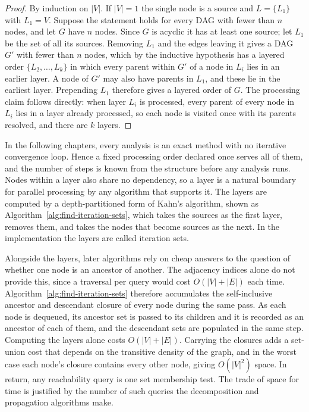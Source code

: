 \documentclass[12pt]{report}
\begin{document}
\begin{proof}
By induction on $|V|$. If $|V| = 1$ the single node is a source and $L = \{L_1\}$ with
$L_1 = V$. Suppose the statement holds for every DAG with fewer than $n$ nodes, and let $G$ have
$n$ nodes. Since $G$ is acyclic it has at least one source; let $L_1$ be the set of all its
sources. Removing $L_1$ and the edges leaving it gives a DAG $G'$ with fewer than $n$ nodes,
which by the inductive hypothesis has a layered order $\{L_2, \dots, L_k\}$ in which every
parent within $G'$ of a node in $L_i$ lies in an earlier layer. A node of $G'$ may also have
parents in $L_1$, and these lie in the earliest layer. Prepending $L_1$ therefore gives a
layered order of $G$. The processing claim follows directly: when layer $L_i$ is processed,
every parent of every node in $L_i$ lies in a layer already processed, so each node is visited
once with its parents resolved, and there are $k$ layers.
\end{proof}

In the following chapters, every analysis is an exact method with no iterative convergence
loop. Hence a fixed processing order declared once serves all of them, and the number of
steps is known from the structure before any analysis runs. Nodes within a layer also share
no dependency, so a layer is a natural boundary for parallel processing by any algorithm
that supports it. The layers are computed by a
depth-partitioned form of Kahn's algorithm, shown as Algorithm~\ref{alg:find-iteration-sets},
which takes the sources as the first layer, removes them, and takes the nodes that become
sources as the next. In the implementation the layers are called iteration sets.

Alongside the layers, later algorithms rely on cheap answers to the question of whether one
node is an ancestor of another. The adjacency indices alone do not provide this, since a
traversal per query would cost $O(|V|+|E|)$ each time. Algorithm~\ref{alg:find-iteration-sets}
therefore accumulates the self-inclusive ancestor and descendant closure of every node during
the same pass. As each node is dequeued, its ancestor set is passed to its children and it is
recorded as an ancestor of each of them, and the descendant sets are populated in the same step.
Computing the layers alone costs $O(|V|+|E|)$. Carrying the closures adds a set-union cost
that depends on the transitive density of the graph, and in the worst case each node's closure
contains every other node, giving $O(|V|^2)$ space. In return, any reachability query is one set membership test. The trade of space for time
is justified by the number of such queries the decomposition and propagation algorithms
make.
\end{document}
